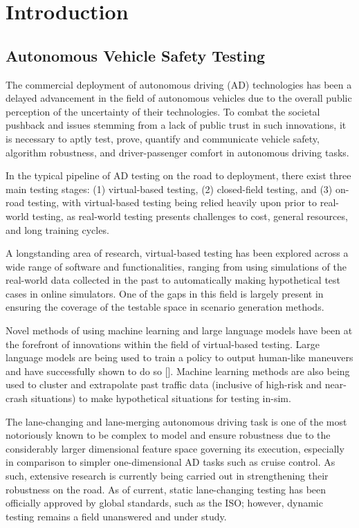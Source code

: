\documentclass[12pt, a4paper]{report}
\begin{document}
\tableofcontents
\newpage


\section{Introduction}

\subsection{Autonomous Vehicle Safety Testing}

The commercial deployment of autonomous driving (AD) technologies has been a delayed advancement in the field of autonomous vehicles due to the overall public perception of the uncertainty of their technologies. To combat the societal pushback and issues stemming from a lack of public trust in such innovations, it is necessary to aptly test, prove, quantify and communicate vehicle safety, algorithm robustness, and driver-passenger comfort in autonomous driving tasks.

In the typical pipeline of AD testing on the road to deployment, there exist three main testing stages: (1) virtual-based testing, (2) closed-field testing, and (3) on-road testing, with virtual-based testing being relied heavily upon prior to real-world testing, as real-world testing presents challenges to cost, general resources, and long training cycles.

A longstanding area of research, virtual-based testing has been explored across a wide range of software and functionalities, ranging from using simulations of the real-world data collected in the past to automatically making hypothetical test cases in online simulators. One of the gaps in this field is largely present in ensuring the coverage of the testable space in scenario generation methods.

Novel methods of using machine learning and large language models have been at the forefront of innovations within the field of virtual-based testing. Large language models are being used to train a policy to output human-like maneuvers and have successfully shown to do so []. Machine learning methods are also being used to cluster and extrapolate past traffic data (inclusive of high-risk and near-crash situations) to make hypothetical situations for testing in-sim.

The lane-changing and lane-merging autonomous driving task is one of the most notoriously known to be complex to model and ensure robustness due to the considerably larger dimensional feature space governing its execution, especially in comparison to simpler one-dimensional AD tasks such as cruise control. As such, extensive research is currently being carried out in strengthening their robustness on the road. As of current, static lane-changing testing has been officially approved by global standards, such as the ISO; however, dynamic testing remains a field unanswered and under study.
\end{document}
